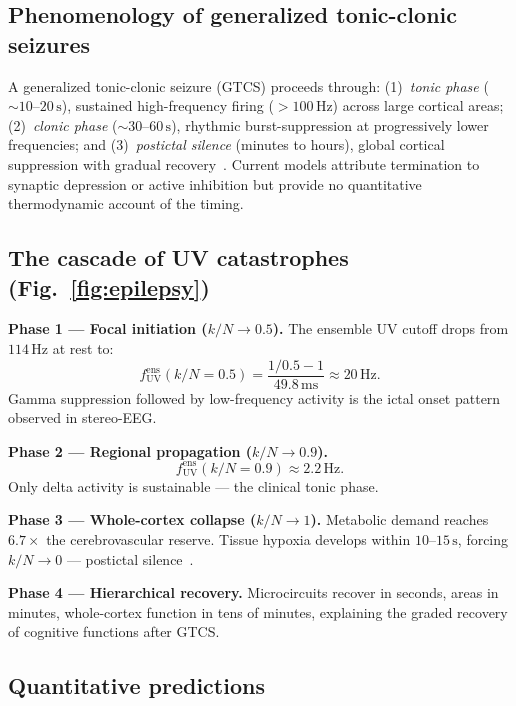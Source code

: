 \documentclass[aps,pre,twocolumn,showpacs,superscriptaddress,longbibliography]{revtex4-2}
\newcommand{\kN}{k/N}
\newcommand{\fUV}{f_{\mathrm{UV}}}
\begin{document}
\subsection{Phenomenology of generalized tonic-clonic seizures}

A generalized tonic-clonic seizure (GTCS) proceeds through:
(1)~\emph{tonic phase} ($\sim 10$--$20\,\mathrm{s}$), sustained
high-frequency firing ($>100\,\mathrm{Hz}$) across large cortical
areas; (2)~\emph{clonic phase} ($\sim 30$--$60\,\mathrm{s}$),
rhythmic burst-suppression at progressively lower frequencies;
and (3)~\emph{postictal silence} (minutes to hours), global
cortical suppression with gradual recovery~\cite{Krishnan2011}.
Current models attribute termination to synaptic depression or
active inhibition but provide no quantitative thermodynamic
account of the timing.

\subsection{The cascade of UV catastrophes
            (Fig.~\ref{fig:epilepsy})}

\textbf{Phase 1 --- Focal initiation ($\kN \to 0.5$).}
The ensemble UV cutoff drops from $114\,\mathrm{Hz}$ at rest to:
\begin{equation}
  \fUV^{\mathrm{ens}}(\kN=0.5) = \frac{1/0.5 - 1}{49.8\,\mathrm{ms}}
  \approx 20\,\mathrm{Hz}.
\end{equation}
Gamma suppression followed by low-frequency activity is the
ictal onset pattern observed in stereo-EEG.

\textbf{Phase 2 --- Regional propagation ($\kN \to 0.9$).}
\begin{equation}
  \fUV^{\mathrm{ens}}(\kN=0.9) \approx 2.2\,\mathrm{Hz}.
\end{equation}
Only delta activity is sustainable --- the clinical tonic phase.

\textbf{Phase 3 --- Whole-cortex collapse ($\kN \to 1$).}
Metabolic demand reaches $6.7\times$ the cerebrovascular
reserve. Tissue hypoxia develops within $10$--$15\,\mathrm{s}$,
forcing $\kN \to 0$ --- postictal silence~\cite{Perucca2014}.

\textbf{Phase 4 --- Hierarchical recovery.}
Microcircuits recover in seconds, areas in minutes,
whole-cortex function in tens of minutes, explaining the graded
recovery of cognitive functions after GTCS.

\subsection{Quantitative predictions}
\end{document}
